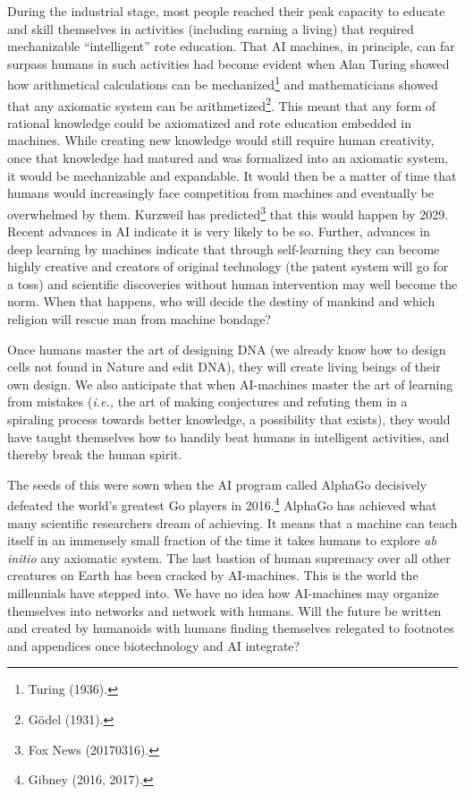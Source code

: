 \begin{multicols}{2}
During the industrial stage, most people reached their peak capacity to educate and skill themselves in activities (including earning a living) that required mechanizable “intelligent” rote education. That AI machines, in principle, can far surpass humans in such activities had become evident when Alan Turing showed how arithmetical calculations can be mechanized\footnote{Turing (1936).}  and mathematicians showed that any axiomatic system can be arithmetized\footnote{Gödel (1931).}. This meant that any form of rational knowledge could be axiomatized and rote education embedded in machines. While creating new knowledge would still require human creativity, once that knowledge had matured and was formalized into an axiomatic system, it would be mechanizable and expandable. It would then be a matter of time that humans would increasingly face competition from machines and eventually be overwhelmed by them. Kurzweil has predicted\footnote{Fox News (20170316).}  that this would happen by 2029. Recent advances in AI indicate it is very likely to be so. Further, advances in deep learning by machines indicate that through self-learning they can become highly creative and creators of original technology (the patent system will go for a toss) and scientific discoveries without human intervention may well become the norm. When that happens, who will decide the destiny of mankind and which religion will rescue man from machine bondage?

Once humans master the art of designing DNA (we already know how to design cells not found in Nature and edit DNA), they will create living beings of their own design. We also anticipate that when AI-machines master the art of learning from mistakes (\textit{i.e.,} the art of making conjectures and refuting them in a spiraling process towards better knowledge, a possibility that exists), they would have taught themselves how to handily beat humans in intelligent activities, and thereby break the human spirit.

The seeds of this were sown when the AI program called AlphaGo decisively defeated the world's greatest Go players in 2016.\footnote{Gibney (2016, 2017).}  AlphaGo has achieved what many scientific researchers dream of achieving. It means that a machine can teach itself in an immensely small fraction of the time it takes humans to explore \textit{ab initio} any axiomatic system. The last bastion of human supremacy over all other creatures on Earth has been cracked by AI-machines. This is the world the millennials have stepped into. We have no idea how AI-machines may organize themselves into networks and network with humans. Will the future be written and created by humanoids with humans finding themselves relegated to footnotes and appendices once biotechnology and AI integrate? 


\end{multicols}
